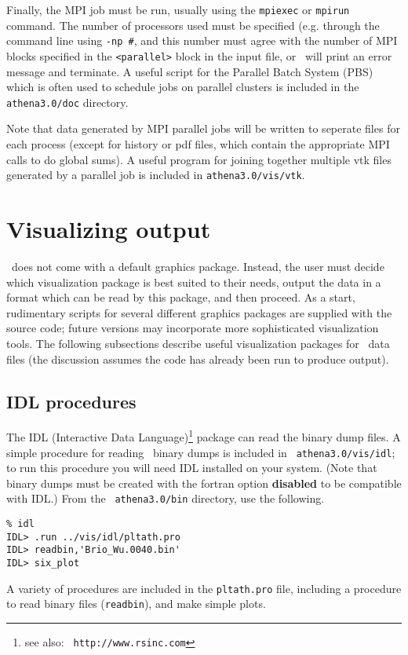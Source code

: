Finally, the MPI job must be run, usually using the {\tt mpiexec} 
or {\tt mpirun} command.  The number of processors used must be specified
(e.g. through the command line using {\tt -np \#}, and this number must agree
with the number of MPI blocks specified in the {\tt <parallel>} block in the
input file, or \ath\ will print an error message and terminate.  A useful
script for the Parallel Batch System (PBS) which is often used to schedule
jobs on parallel clusters is included in the {\tt athena3.0/doc} directory.

Note that data generated by MPI parallel jobs will be written to seperate files
for each process (except for history or pdf files, which contain the
appropriate MPI calls to do global sums).  A useful program for joining
together multiple vtk files generated by a parallel job is
included in {\tt athena3.0/vis/vtk}.

\section{Visualizing output}

\ath\ does not come with a default graphics package.  Instead, the user must
decide which visualization package is best suited to their needs, output the
data in a format which can be read by this package, and then proceed.
As a start, rudimentary
scripts for several different graphics packages are supplied with the source
code; future versions may incorporate more sophisticated visualization
tools.  The following subsections describe useful visualization packages for
\ath\ data files (the discussion assumes the code has already been run to
produce output).

\subsection{IDL procedures}

The IDL (Interactive Data Language)\footnote{see also: {\tt
http://www.rsinc.com}} package can read the binary dump files.
A simple procedure for reading \ath\ binary dumps is included in {\tt
athena3.0/vis/idl}; to run this procedure you will need IDL installed on
your system.  (Note that binary dumps must be created with the fortran
option {\bf disabled} to be compatible with IDL.)  From the {\tt
athena3.0/bin} directory, use the following.
\begin{verbatim}
% idl
IDL> .run ../vis/idl/pltath.pro 
IDL> readbin,'Brio_Wu.0040.bin'
IDL> six_plot
\end{verbatim}
A variety of procedures are included in the {\tt pltath.pro} file, including 
a procedure to read binary files ({\tt readbin}), and make simple plots.

